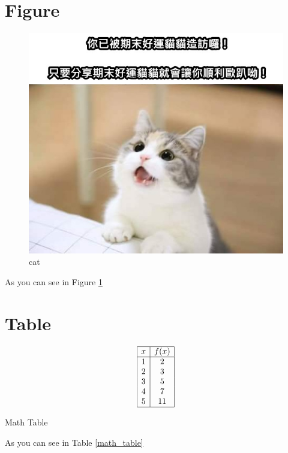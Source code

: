\documentclass[12pt,a4paper]{article}
\begin{document}
\section*{Figure}
\begin{figure}[h]%
    \centering %
    \includegraphics[width=0.5\linewidth]{cat.png} %
    \caption{cat} %
    \label{cat} %
\end{figure}
As you can see in Figure \ref{cat}

\section*{Table}
\begin{table}[h]
    \centering
    \begin{minipage}{0.6\textwidth}
        \centering
        \begin{equation}
            \begin{array}{|c|c|}
                \hline
                x & f(x) \\
                \hline
                1 & 2 \\
                2 & 3 \\
                3 & 5 \\
                4 & 7 \\
                5 & 11 \\
                \hline
            \end{array}
        \end{equation}
    \end{minipage}
    \caption{Math Table}
    \label{math_table}
\end{table}
As you can see in Table \ref{math_table}
\end{document}
